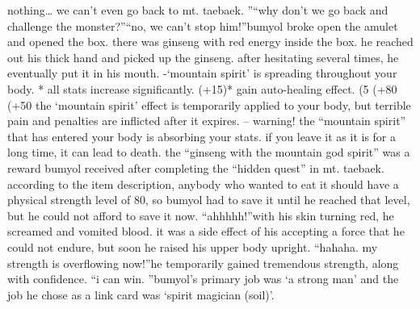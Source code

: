  nothing… we can’t even go back to mt.
 taebaek.
”“why don’t we go back and challenge the monster?”“no, we can’t stop him!”bumyol broke open the amulet and opened the box.
 there was ginseng with red energy inside the box.
he reached out his thick hand and picked up the ginseng.
 after hesitating several times, he eventually put it in his mouth.
-‘mountain spirit’ is spreading throughout your body.
* all stats increase significantly.
 (+15)* gain auto-healing effect.
 (5%
 (+80%
 (+50%
 the ‘mountain spirit’ effect is temporarily applied to your body, but terrible pain and penalties are inflicted after it expires.
– warning! the “mountain spirit” that has entered your body is absorbing your stats.
 if you leave it as it is for a long time, it can lead to death.
the “ginseng with the mountain god spirit” was a reward bumyol received after completing the “hidden quest” in mt.
 taebaek.
according to the item description, anybody who wanted to eat it should have a physical strength level of 80, so bumyol had to save it until he reached that level, but he could not afford to save it now.
“ahhhhh!”with his skin turning red, he screamed and vomited blood.
 it was a side effect of his accepting a force that he could not endure, but soon he raised his upper body upright.
“hahaha.
 my strength is overflowing now!”he temporarily gained tremendous strength, along with confidence.
“i can win.
”bumyol’s primary job was ‘a strong man’ and the job he chose as a link card was ‘spirit magician (soil)’.

